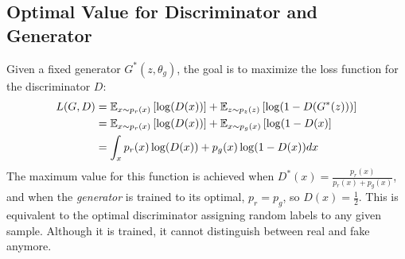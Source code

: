         \subsection{Optimal Value for Discriminator and Generator}
        Given a fixed generator $G^*(z, \theta_g)$, the goal is to maximize the loss function for the discriminator $D$:
        \begin{align}\label{eq:max_dis}
            L(G, D) &= \mathbb{E}_{x\sim p_r(x)}\left[\log (D(x))\right] +\mathbb{E}_{z\sim p_z(z)}\left[\log(1- D(G^*(z)))\right]\notag\\
            &= \mathbb{E}_{x\sim p_r(x)}\left[\log (D(x))\right] +\mathbb{E}_{x\sim p_g(x)}\left[\log(1- D(x)\right]\\
            &= \int_{x}p_r(x)\log(D(x))+ p_g(x)\log(1-D(x))dx\notag
        \end{align}
        The maximum value for this function is achieved when $D^*(x) = \frac{p_r(x)}{p_r(x)+p_g(x)}$, and when the \textit{generator} is trained to its optimal, $p_r = p_g$, so $D(x) = \frac{1}{2}$. This is equivalent to the optimal discriminator assigning random labels to any given sample. Although it is trained, it cannot distinguish between real and fake anymore.
